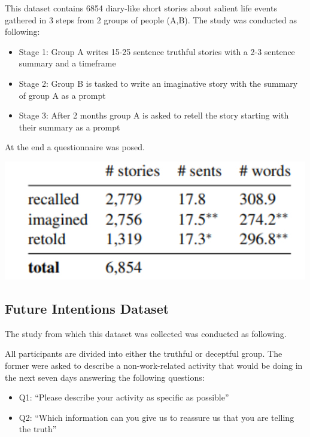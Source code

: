 \documentclass[10pt,twocolumn,letterpaper]{article}
\begin{document}
This dataset contains 6854 diary-like short stories about salient life events gathered in 3 steps from 2 groups of people (A,B).
The study was conducted as following:

\begin{itemize}
    \item Stage 1: Group A writes 15-25 sentence truthful stories with a 2-3 sentence summary and a timeframe
    \item Stage 2: Group B is tasked to write an imaginative story with the summary of group A as a prompt
    \item Stage 3: After 2 months group A is asked to retell the story starting with their summary as a prompt
\end{itemize}
At the end a questionnaire was posed. \\

\begin{center}
\includegraphics[scale=0.40]{img/autobio_mem_dataset.jpg} \\
\end{center}

\subsection{Future Intentions Dataset}

The study from which this dataset was collected was conducted as following.

All participants are divided into either the truthful or deceptful group.
The former were asked to describe a non-work-related activity that would be doing in the next seven days answering the following questions:

\begin{itemize}
    \item Q1: “Please describe your activity as specific as possible”
    \item Q2: “Which information can you give us to reassure us that you are telling the truth”
\end{itemize}
\end{document}
